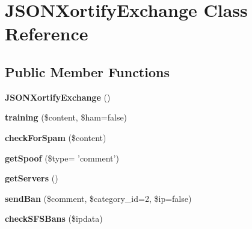 \hypertarget{class_j_s_o_n_xortify_exchange}{\section{J\-S\-O\-N\-Xortify\-Exchange Class Reference}
\label{class_j_s_o_n_xortify_exchange}
}
\subsection*{Public Member Functions}
\begin{DoxyCompactItemize}
\item 
\hypertarget{class_j_s_o_n_xortify_exchange_a289dd6a2438f9cd5015f727399577af0}{{\bfseries J\-S\-O\-N\-Xortify\-Exchange} ()}\label{class_j_s_o_n_xortify_exchange_a289dd6a2438f9cd5015f727399577af0}

\item 
\hypertarget{class_j_s_o_n_xortify_exchange_a807b08c7f3aaa4fdf9a7b59efd667822}{{\bfseries training} (\$content, \$ham=false)}\label{class_j_s_o_n_xortify_exchange_a807b08c7f3aaa4fdf9a7b59efd667822}

\item 
\hypertarget{class_j_s_o_n_xortify_exchange_aecd479aedfbee8de6e69d99b2c1c3032}{{\bfseries check\-For\-Spam} (\$content)}\label{class_j_s_o_n_xortify_exchange_aecd479aedfbee8de6e69d99b2c1c3032}

\item 
\hypertarget{class_j_s_o_n_xortify_exchange_ad83ec5374ad31ddb56aa142f7b8b41fd}{{\bfseries get\-Spoof} (\$type= 'comment')}\label{class_j_s_o_n_xortify_exchange_ad83ec5374ad31ddb56aa142f7b8b41fd}

\item 
\hypertarget{class_j_s_o_n_xortify_exchange_a956fd6bed4914327b8ca89986e494d0d}{{\bfseries get\-Servers} ()}\label{class_j_s_o_n_xortify_exchange_a956fd6bed4914327b8ca89986e494d0d}

\item 
\hypertarget{class_j_s_o_n_xortify_exchange_a56280c3eaa57e9c86773f50c5f3db828}{{\bfseries send\-Ban} (\$comment, \$category\-\_\-id=2, \$ip=false)}\label{class_j_s_o_n_xortify_exchange_a56280c3eaa57e9c86773f50c5f3db828}

\item 
\hypertarget{class_j_s_o_n_xortify_exchange_a29b766f13b2a5185eb2feea89f782b02}{{\bfseries check\-S\-F\-S\-Bans} (\$ipdata)}\label{class_j_s_o_n_xortify_exchange_a29b766f13b2a5185eb2feea89f782b02}


\end{DoxyCompactItemize}
